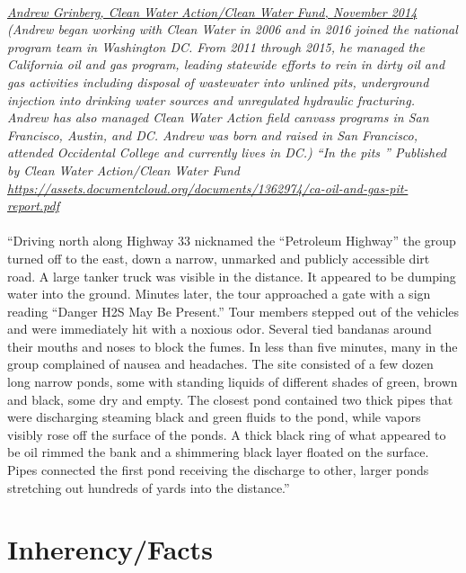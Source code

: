 \documentclass{article}
\begin{document}
\paragraph{}
\small
\textit{  
\underline{Andrew Grinberg, Clean Water Action/Clean Water Fund, November 2014}
  (Andrew began working with Clean Water in 2006 and in 2016 joined the national program team in Washington DC. From 2011 through 2015, he managed the California oil and gas program, leading statewide efforts to rein in dirty oil and gas activities including disposal of wastewater into unlined pits, underground injection into drinking water sources and unregulated hydraulic fracturing. Andrew has also managed Clean Water Action field canvass programs in San Francisco, Austin, and DC. Andrew was born and raised in San Francisco, attended Occidental College and currently lives in DC.) “In the pits ” Published by Clean Water Action/Clean Water Fund 
\url{https://assets.documentcloud.org/documents/1362974/ca-oil-and-gas-pit-report.pdf} }
\normalsize
\paragraph{}
``Driving north along Highway 33  nicknamed the ``Petroleum Highway''  the group turned off to the east, down a narrow, unmarked and publicly accessible dirt road. A large tanker truck was visible in the distance. It appeared to be dumping water into the ground. Minutes later, the tour approached a gate with a sign reading ``Danger H2S May Be Present.'' Tour members stepped out of the vehicles and were immediately hit with a noxious odor. Several tied bandanas around their mouths and noses to block the fumes. In less than five minutes, many in the group complained of nausea and headaches. The site consisted of a few dozen long narrow ponds, some with standing liquids of different shades of green, brown and black, some dry and empty. The closest pond contained two thick pipes that were discharging steaming black and green fluids to the pond, while vapors visibly rose off the surface of the ponds. A thick black ring of what appeared to be oil rimmed the bank and a shimmering black layer floated on the surface. Pipes connected the first pond receiving the discharge to other, larger ponds stretching out hundreds of yards into the distance.''

\section{Inherency/Facts}
\end{document}
